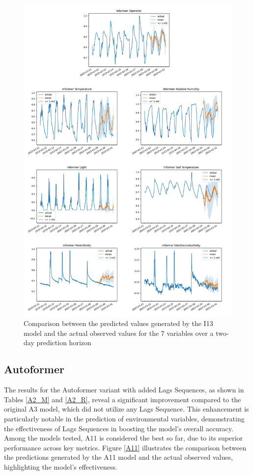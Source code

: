 \begin{figure}[htbp]
    \centering
    \includegraphics[width=15 cm]{6_ChapterResults/figuras/I13.png}
    \caption{Comparison between the predicted values generated by the I13 model and the actual observed values for the 7 variables over a two-day prediction horizon}
    \label{I13}
\end{figure}

\subsection{Autoformer}
The results for the Autoformer variant with added Lags Sequences, as shown in Tables \ref{A2_M} and \ref{A2_R}, reveal a significant improvement compared to the original A3 model, which did not utilize any Lags Sequence. This enhancement is particularly notable in the prediction of environmental variables, demonstrating the effectiveness of Lags Sequences in boosting the model's overall accuracy. Among the models tested, A11 is considered the best so far, due to its superior performance across key metrics. Figure \ref{A11} illustrates the comparison between the predictions generated by the A11 model and the actual observed values, highlighting the model's effectiveness.

